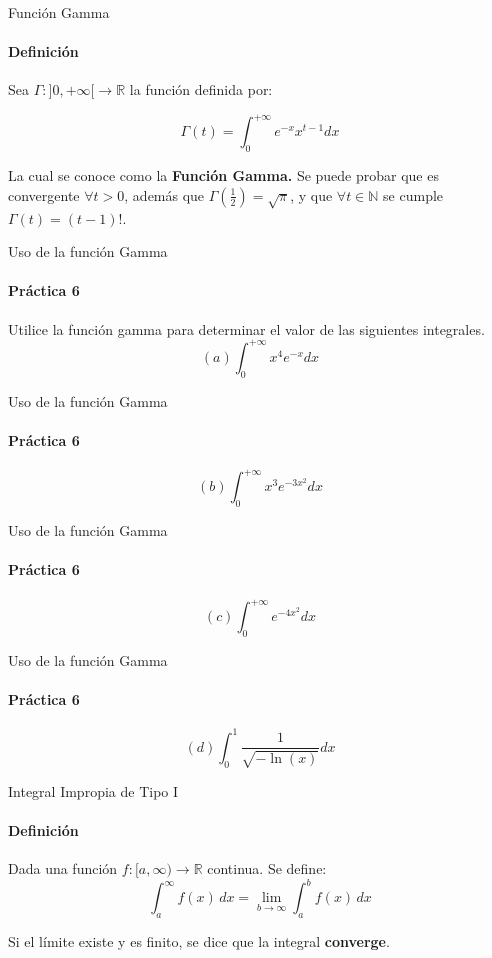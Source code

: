 \documentclass{plantillaPPT}
\begin{document}
\primeraDiapo

\begin{frame}{Función Gamma}
    \framesubtitle{Definición}

\begin{definicion}
    Sea \(\Gamma:]0,+\infty[ \to \mathbb{R}\) la función definida por: \vspace{0.3cm}

\[\Gamma(t)=\int_{0}^{+\infty} e^{-x}x^{t-1}dx\]
\vspace{0.3cm}

La cual se conoce como la \textbf{Función Gamma.} Se puede probar que es convergente \(\forall t>0\), además que \(\Gamma(\frac{1}{2}) = \sqrt{\pi}\), y que \(\forall t \in \mathbb{N}\) se cumple \(\Gamma(t)=(t-1)!\).

\end{definicion}
    
\end{frame}

\begin{frame}{Uso de la función Gamma}
    \framesubtitle{Práctica 6}
    
\vspace{-0.7cm}
Utilice la función gamma para determinar el valor de las siguientes integrales.
\vspace{0.6cm}
\[(a) \int_{0}^{+\infty} x^4e^{-x}dx \]
    
\end{frame}

\begin{frame}{Uso de la función Gamma}
\framesubtitle{Práctica 6}

\[(b) \int_{0}^{+\infty} x^3e^{-3x^2}dx \]
    
\end{frame}

\begin{frame}{Uso de la función Gamma}
\framesubtitle{Práctica 6}

\[(c) \int_{0}^{+\infty} e^{-4x^2}dx \]
    
\end{frame}

\begin{frame}{Uso de la función Gamma}
\framesubtitle{Práctica 6}

\[(d) \int_{0}^{1} \frac{1}{\sqrt{-\ln(x)}}dx \]
    
\end{frame}

\begin{frame}{Integral Impropia de Tipo I}
    \framesubtitle{Definición}
    \vspace{-0.5cm}

\begin{definicion}
Dada una función \( f:[a, \infty) \to \mathbb{R} \) continua. Se define:
\vspace{0.3cm}
\[
\int_a^{\infty} f(x) \, dx = \lim_{b \to \infty} \int_a^b f(x) \, dx
\]\vspace{0.3cm}

Si el límite existe y es finito, se dice que la integral \textbf{converge}.
\end{definicion}

\end{frame}
\end{document}
